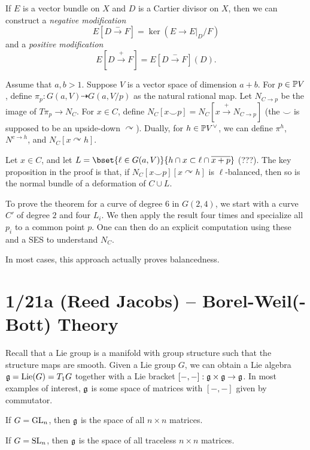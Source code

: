 \documentclass{article}
\begin{document}
If $E$ is a vector bundle on $X$ and $D$ is a Cartier divisor on $X$, then we can construct a \emph{negative modification}
\[
	E[D \xrightarrow{-} F] = \ker(E \to E|_D / F)
\]
and a \emph{positive modification}
\[
	E[D \xrightarrow{+} F] = E[D \xrightarrow{-} F](D).
\]

Assume that $a, b > 1$.
Suppose $V$ is a vector space of dimension $a + b$.
For $p \in \mathbb{P} V$, define $\pi_p: G(a, V) \dashrightarrow G(a, V/p)$ as the natural rational map.
Let $N_{C \to p}$ be the image of $T \pi_p \to N_C$.
For $x \in C$, define $N_C[x \smile p] = N_C[x \xrightarrow{+} N_{C \to p}]$ (the $\smile$ is supposed to be an upside-down $\curvearrowright$).
Dually, for $h \in \mathbb{P} V^\vee$, we can define $\pi^h$, $N^{c \to h}$, and $N_C[x \curvearrowright h]$.

Let $x \in C$, and let $L = \bset{\ell \in G(a, V)}{h \cap x \subset \ell \cap \ol{x + p}}$ (???).
The key proposition in the proof is that, if $N_C[x \smile p][x \curvearrowright h]$ is $\ell$-balanced, then so is the normal bundle of a deformation of $C \cup L$.

\begin{ex}
	To prove the theorem for a curve of degree $6$ in $G(2, 4)$, we start with a curve $C'$ of degree $2$ and four $L_i$.
	We then apply the result four times and specialize all $p_i$ to a common point $p$.
	One can then do an explicit computation using these and a SES to understand $N_C$.
\end{ex}

In most cases, this approach actually proves balancedness.

\section{1/21a (Reed Jacobs) -- Borel-Weil(-Bott) Theory}

Recall that a Lie group is a manifold with group structure such that the structure maps are smooth.
Given a Lie group $G$, we can obtain a Lie algebra $\mathfrak{g} = \operatorname{Lie}(G) = T_1 G$ together with a Lie bracket $[-,-]: \mathfrak{g} \times \mathfrak{g} \to \mathfrak{g}$.
In most examples of interest, $\mathfrak{g}$ is some space of matrices with $[-,-]$ given by commutator.

\begin{ex}
	If $G = \mathrm{GL}_n$, then $\mathfrak{g}$ is the space of all $n \times n$ matrices.
\end{ex}

\begin{ex}
	If $G = \mathrm{SL}_n$, then $\mathfrak{g}$ is the space of all traceless $n \times n$ matrices.
\end{ex}
\end{document}
